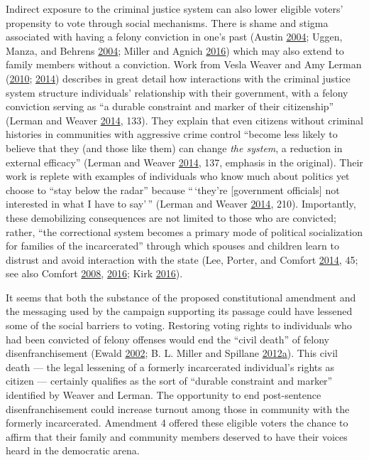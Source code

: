 \documentclass[
  12pt,
]{article}
\begin{document}
Indirect exposure to the criminal justice system can also lower eligible voters' propensity to vote through social mechanisms. There is shame and stigma associated with having a felony conviction in one's past (Austin \protect\hyperlink{ref-Austin2004}{2004}; Uggen, Manza, and Behrens \protect\hyperlink{ref-Uggen2004a}{2004}; Miller and Agnich \protect\hyperlink{ref-Miller2016}{2016}) which may also extend to family members without a conviction. Work from Vesla Weaver and Amy Lerman (\protect\hyperlink{ref-Weaver2010}{2010}; \protect\hyperlink{ref-Lerman2014}{2014}) describes in great detail how interactions with the criminal justice system structure individuals' relationship with their government, with a felony conviction serving as ``a durable constraint and marker of their citizenship'' (Lerman and Weaver \protect\hyperlink{ref-Lerman2014}{2014}, 133). They explain that even citizens without criminal histories in communities with aggressive crime control ``become less likely to believe that they (and those like them) can change \emph{the system}, a reduction in external efficacy'' (Lerman and Weaver \protect\hyperlink{ref-Lerman2014}{2014}, 137, emphasis in the original). Their work is replete with examples of individuals who know much about politics yet choose to ``stay below the radar'' because ``\,`they're {[}government officials{]} not interested in what I have to say'\,'' (Lerman and Weaver \protect\hyperlink{ref-Lerman2014}{2014}, 210). Importantly, these demobilizing consequences are not limited to those who are convicted; rather, ``the correctional system becomes a primary mode of political socialization for families of the incarcerated'' through which spouses and children learn to distrust and avoid interaction with the state (Lee, Porter, and Comfort \protect\hyperlink{ref-Lee2014}{2014}, 45; see also Comfort \protect\hyperlink{ref-Comfort2008}{2008}, \protect\hyperlink{ref-Comfort2016}{2016}; Kirk \protect\hyperlink{ref-Kirk2016}{2016}).

It seems that both the substance of the proposed constitutional amendment and the messaging used by the campaign supporting its passage could have lessened some of the social barriers to voting. Restoring voting rights to individuals who had been convicted of felony offenses would end the ``civil death'' of felony disenfranchisement (Ewald \protect\hyperlink{ref-Ewald2002}{2002}; B. L. Miller and Spillane \protect\hyperlink{ref-Miller2012}{2012}\protect\hyperlink{ref-Miller2012}{a}). This civil death --- the legal lessening of a formerly incarcerated individual's rights as citizen --- certainly qualifies as the sort of ``durable constraint and marker'' identified by Weaver and Lerman. The opportunity to end post-sentence disenfranchisement could increase turnout among those in community with the formerly incarcerated. Amendment 4 offered these eligible voters the chance to affirm that their family and community members deserved to have their voices heard in the democratic arena.
\end{document}
